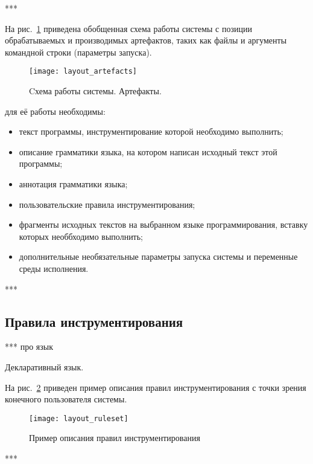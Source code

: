 ***

На рис.~\ref{fig:layout_artefacts} приведена обобщенная схема работы системы с позиции обрабатываемых и производимых артефактов, таких как файлы и аргументы командной строки (параметры запуска).

\begin{figure}[!h]
	\centering
	\texttt{[image: layout\_artefacts]}
	\caption{Cхема работы системы. Артефакты.}
	\label{fig:layout_artefacts}
\end{figure}

для её работы необходимы:
\begin{itemize}[noitemsep]
  \item текст программы, инструментирование которой необходимо выполнить;
  \item описание грамматики языка, на котором написан исходный текст этой программы;
  \item аннотация грамматики языка;
  \item пользовательские правила инструментирования;
  \item фрагменты исходных текстов на выбранном языке программирования, вставку которых необбходимо выполнить;
  \item дополнительные необязательные параметры запуска системы и переменные среды исполнения.
\end{itemize}

***

\subsection{Правила инструментирования}

***
про язык

Декларативный язык.

На рис.~\ref{fig:layout_ruleset} приведен пример описания правил инструментирования с точки зрения конечного пользователя системы.

\begin{figure}[!h]
	\centering
	\texttt{[image: layout\_ruleset]}
	\caption{Пример описания правил инструментирования}
	\label{fig:layout_ruleset}
\end{figure}

***


